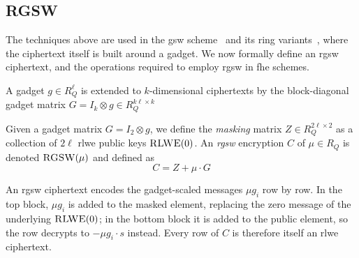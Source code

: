 \subsection{RGSW}
The techniques above are used in the \gls{gsw} scheme~\cite{cryptoeprint:2013/340} and its ring variants~\cite{cryptoeprint:2014/816, cryptoeprint:2018/421}, where the ciphertext itself is built around a gadget. We now formally define an \gls{rgsw} ciphertext, and the operations required to employ \gls{rgsw} in \gls{fhe} schemes. %

\begin{definition}
    \label{def:gadget-matrix}
    A gadget $g \in R_Q^\ell$ is extended to $k$-dimensional ciphertexts by the block-diagonal gadget matrix $G = I_k \otimes g \in R_Q^{k\ell\times k}$
\end{definition}

\begin{definition}
    Given a gadget matrix $G = I_2 \otimes g$, we define the \emph{masking} matrix $Z \in R_Q^{2\ell\times 2}$ as a collection of $2\ell$ \gls{rlwe} public keys $\Call{RLWE}{0}$. An \emph{\gls{rgsw}} encryption $C$ of $\mu \in R_Q$ is denoted $\Call{RGSW}{\mu}$ and defined as
    \begin{equation}
        \label{def:rgsw}
        C = Z + \mu\cdot G %
    \end{equation}
\end{definition}


An \gls{rgsw} ciphertext encodes the gadget-scaled messages $\mu g_i$ row by row. In the top block, $\mu g_i$ is added to the masked element, replacing the zero message of the underlying $\Call{RLWE}{0}$; in the bottom block it is added to the public element, so the row decrypts to $-\mu g_i\cdot s$ instead. Every row of $C$ is therefore itself an \gls{rlwe} ciphertext.


